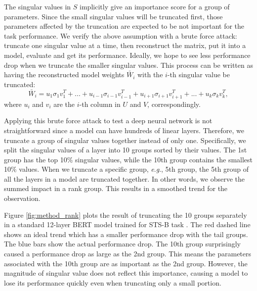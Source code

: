 \documentclass{article} %
\newcommand{\eg}{\textit{e}.\textit{g}.}
\begin{document}
The singular values in $S$ implicitly give an importance score for a group of parameters. Since the small singular values will be truncated first, those parameters affected by the truncation are expected to be not important for the task performance. We verify the above assumption with a brute force attack: truncate one singular value at a time, then reconstruct the matrix, put it into a model, evaluate and get its performance. Ideally, we hope to see less performance drop when we truncate the smaller singular values. This process can be written as having the reconstructed model weights $\bar W_i$ with the $i$-th singular value be truncated:
\begin{equation}
    \bar W_i = {u_1}{\sigma _1}v_1^T + ... + {u_{i-1}}{\sigma _{i-1}}v_{i-1}^T + {u_{i+1}}{\sigma _{i+1}}v_{i+1}^T + ... + {u_k}{\sigma _k}v_k^T,
    \label{equ:splitting}
\end{equation}
where $u_i$ and $v_i$ are the $i$-th column in $U$ and $V$, correspondingly.

Applying this brute force attack to test a deep neural network is not straightforward since a model can have hundreds of linear layers. Therefore, we truncate a group of singular values together instead of only one. Specifically, we split the singular values of a layer into 10 groups sorted by their values. The 1st group has the top 10\% singular values, while the 10th group contains the smallest 10\% values. When we truncate a specific group, \eg, 5th group, the 5th group of all the layers in a model are truncated together. In other words, we observe the summed impact in a rank group. This results in a smoothed trend for the observation.

Figure \ref{fig:method_rank} plots the result of truncating the 10 groups separately in a standard 12-layer BERT model \citep{devlin2018bert} trained for STS-B task \citep{cer-etal-2017-semeval}. The red dashed line shows an ideal trend which has a smaller performance drop with the tail groups. The blue bars show the actual performance drop. The 10th group surprisingly caused a performance drop as large as the 2nd group. This means the parameters associated with the 10th group are as important as the 2nd group. However, the magnitude of singular value does not reflect this importance, causing a model to lose its performance quickly even when truncating only a small portion.

\end{document}
